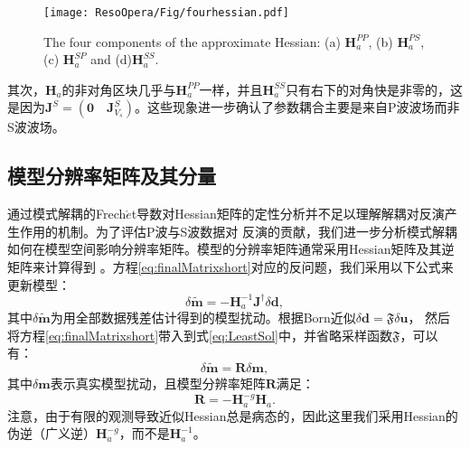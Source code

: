 \begin{figure*}
    \begin{center}
        \texttt{[image: ResoOpera/Fig/fourhessian.pdf]}
        \caption{
            The four components of the approximate Hessian:
                        (a) $\mathbf{H}_a^{PP}$,
            (b) $\mathbf{H}_a^{PS}$, (c) $\mathbf{H}_a^{SP}$ and (d)$\mathbf{H}_a^{SS}$.
    }
    \label{fig:fourHessian}
    \end{center}
\end{figure*}



其次，$\mathbf{H}_a$的非对角区块几乎与$\mathbf{H}_a^{PP}$一样，并且$\mathbf{H}_a^{SS}$只有右下的对角快是非零的，这是因为$\mathbf{J}^S=(\mathbf{0}\quad\mathbf{J}^S_{V_s})$。这些现象进一步确认了参数耦合主要是来自P波波场而非S波波场。

\subsection{模型分辨率矩阵及其分量}
通过模式解耦的Frech{$\acute{e}$}t导数对Hessian矩阵的定性分析并不足以理解解耦对反演产生作用的机制。为了评估P波与S波数据对
反演的贡献，我们进一步分析模式解耦如何在模型空间影响分辨率矩阵。模型的分辨率矩阵通常采用Hessian矩阵及其逆矩阵来计算得到
\cite[]{menke:1989,snieder1999inverse}。方程\eqref{eq:finalMatrixshort}对应的反问题，我们采用以下公式来更新模型：
\begin{equation}
        \delta \mathbf{\tilde{m}}=-\mathbf{H}^{-1}_a\mathbf{J}^{\dagger}\delta 
        \mathbf{d},
        \label{eq:LeastSol}
\end{equation}
其中$\delta\mathbf{\tilde{m}}$为用全部数据残差估计得到的模型扰动。根据Born近似$\delta\mathbf{d}=\mathfrak{F}{\delta\mathbf{u}}$，
然后将方程\eqref{eq:finalMatrixshort}带入到式\eqref{eq:LeastSol}中，并省略采样函数$\mathfrak{F}$，可以有：
\begin{equation}
	\delta \mathbf{\tilde{m}}=\mathbf{R}\delta \mathbf{m},
	\label{eq:ResoMatr}
\end{equation}
其中$\delta \mathbf{m}$表示真实模型扰动，且模型分辨率矩阵$\mathbf{R}$满足：
\begin{equation}
        \mathbf{R}=-\mathbf{H}^{-g}_a\mathbf{H}_a. 
        \label{eq:ResoOper} 
\end{equation}
注意，由于有限的观测导致近似Hessian总是病态的，因此这里我们采用Hessian的伪逆（广义逆）$\mathbf{H}^{-g}_a$，而不是$\mathbf{H}^{-1}_a$。

